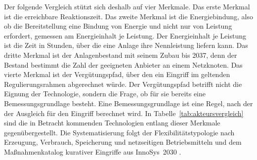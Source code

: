 Der folgende Vergleich stützt sich deshalb auf vier Merkmale.
Das erste Merkmal ist die erreichbare Reaktionszeit.
Das zweite Merkmal ist die Energiebindung, also ob die Bereitstellung eine Bindung von Energie und nicht nur von Leistung erfordert, gemessen am Energieinhalt je Leistung.
Der Energieinhalt je Leistung ist die Zeit in Stunden, über die eine Anlage ihre Nennleistung liefern kann.
Das dritte Merkmal ist der Anlagenbestand mit seinem Zubau bis 2037, denn der Bestand bestimmt die Zahl der geeigneten Anbieter an einem Netzknoten.
Das vierte Merkmal ist der Vergütungspfad, über den ein Eingriff im geltenden Regulierungsrahmen abgerechnet würde.
Der Vergütungspfad betrifft nicht die Eignung der Technologie, sondern die Frage, ob für sie bereits eine Bemessungsgrundlage besteht.
Eine Bemessungsgrundlage ist eine Regel, nach der der Ausgleich für den Eingriff berechnet wird.
In Tabelle~\ref{tab:akteursvergleich} sind die in Betracht kommenden Technologien entlang dieser Merkmale gegenübergestellt.
Die Systematisierung folgt der Flexibilitätstypologie nach Erzeugung, Verbrauch, Speicherung und netzseitigen Betriebsmitteln \cite{vde_etg_flexibilisierung_2023} und dem Maßnahmenkatalog kurativer Eingriffe aus InnoSys~2030 \cite{innosys_2030_gesamtverbund_innovationen_2021}.

